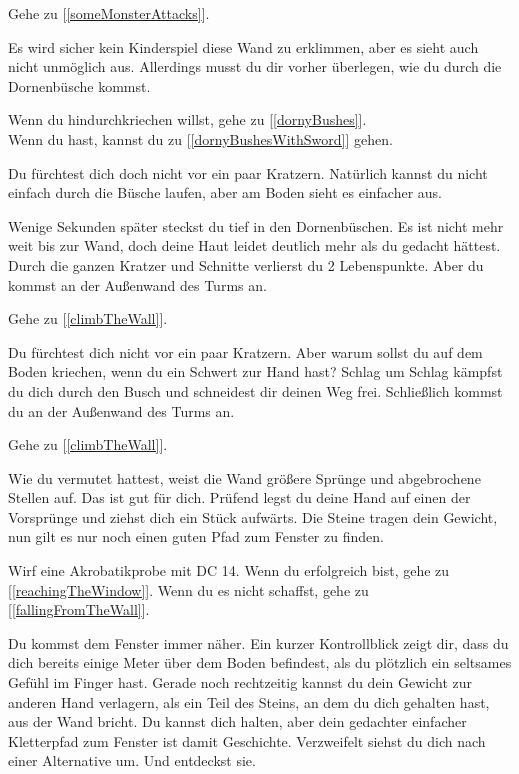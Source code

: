 Gehe zu [\ref{someMonsterAttacks}].


Es wird sicher kein Kinderspiel diese Wand zu erklimmen, aber es sieht auch nicht unmöglich aus. Allerdings musst du dir vorher überlegen, wie du durch die Dornenbüsche kommst.

Wenn du hindurchkriechen willst, gehe zu [\ref{dornyBushes}].
\\Wenn du  hast, kannst du zu [\ref{dornyBushesWithSword}] gehen.


Du fürchtest dich doch nicht vor ein paar Kratzern. Natürlich kannst du nicht einfach durch die Büsche laufen, aber am Boden sieht es einfacher aus.

Wenige Sekunden später steckst du tief in den Dornenbüschen. Es ist nicht mehr weit bis zur Wand, doch deine Haut leidet deutlich mehr als du gedacht hättest. Durch die ganzen Kratzer und Schnitte verlierst du 2 Lebenspunkte. Aber du kommst an der Außenwand des Turms an.

Gehe zu [\ref{climbTheWall}].


Du fürchtest dich nicht vor ein paar Kratzern. Aber warum sollst du auf dem Boden kriechen, wenn du ein Schwert zur Hand hast? Schlag um Schlag kämpfst du dich durch den Busch und schneidest dir deinen Weg frei. Schließlich kommst du an der Außenwand des Turms an.

Gehe zu [\ref{climbTheWall}].


Wie du vermutet hattest, weist die Wand größere Sprünge und abgebrochene Stellen auf. Das ist gut für dich. Prüfend legst du deine Hand auf einen der Vorsprünge und ziehst dich ein Stück aufwärts. Die Steine tragen dein Gewicht, nun gilt es nur noch einen guten Pfad zum Fenster zu finden.

Wirf eine Akrobatikprobe mit DC 14. Wenn du erfolgreich bist, gehe zu [\ref{reachingTheWindow}]. Wenn du es nicht schaffst, gehe zu [\ref{fallingFromTheWall}].


Du kommst dem Fenster immer näher. Ein kurzer Kontrollblick zeigt dir, dass du dich bereits einige Meter über dem Boden befindest, als du plötzlich ein seltsames Gefühl im Finger hast. Gerade noch rechtzeitig kannst du dein Gewicht zur anderen Hand verlagern, als ein Teil des Steins, an dem du dich gehalten hast, aus der Wand bricht. Du kannst dich halten, aber dein gedachter einfacher Kletterpfad zum Fenster ist damit Geschichte. Verzweifelt siehst du dich nach einer Alternative um. Und entdeckst sie.

